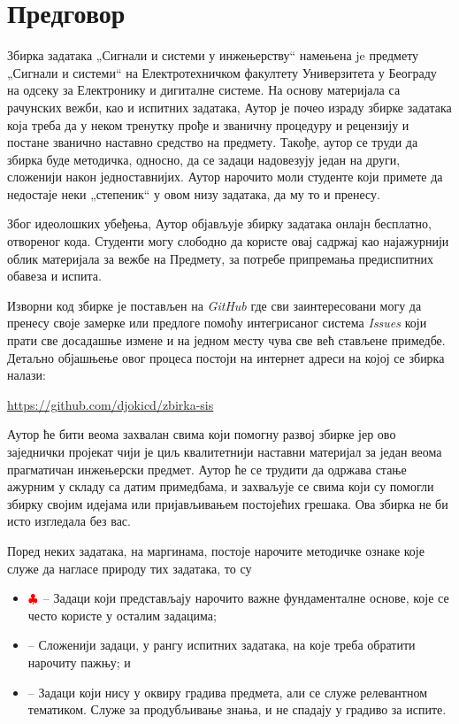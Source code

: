 \section*{Предговор}

Збирка задатака „Сигнали и системи у инжењерству“ намењена je предмету „Сигнали и системи“ на 
Електротехничком факултету Универзитета у Београду на одсеку за Електронику и дигиталне системе. На основу материјала 
са рачунских вежби, као и испитних задатака, Аутор је почео израду збирке задатака која треба да у неком тренутку 
прође и званичну процедуру и рецензију и постане званично наставно средство на предмету. 
Такође, аутор се труди да збирка буде методичка, односно, да се задаци надовезују један на други, сложенији након
једноставнијих. 
Аутор нарочито моли студенте који примете да недостаје неки „степеник“ у овом низу задатака, да му то и
пренесу. 

Због идеолошких убеђења, Аутор објављује збирку задатака онлајн бесплатно, отвореног кода. 
Студенти могу слободно да користе овај садржај као најажурнији облик материјала за вежбе на 
Предмету, за потребе припремања предиспитних обавеза и испита. 

Изворни код збирке је постављен на \textit{GitHub} где сви заинтересовани могу да пренесу своје замерке или 
предлоге помоћу интегрисаног система \textit{Issues} који прати све досадашње измене и на једном месту чува све 
већ стављене примедбе. Детаљно објашњење овог процеса постоји на интернет адреси на којој се збирка налази:
\begin{center}
    \url{https://github.com/djokicd/zbirka-sis}
\end{center}

Аутор ће бити веома захвалан свима који помогну развој збирке јер ово заједнички
пројекат чији је циљ квалитетнији наставни материјал за један веома прагматичан инжењерски предмет. 
Аутор ће се трудити да одржава стање ажурним у складу са датим примедбама, и захваљује се свима 
који су помогли збирку својим идејама или пријављивањем постојећих грешака. Ова збирка не би исто изгледала без вас. 

Поред неких задатака, на маргинама, постоје нарочите методичке ознаке које служе да нагласе природу тих задатака, то су 
\begin{itemize}
    \item $\color{red}\clubsuit$ -- Задаци који представљају нарочито важне фундаменталне основе, које се често користе у 
    осталим задацима;
    \item \textcolor{red}{\warning} -- Сложенији задаци, у рангу испитних задатака, на које треба обратити нарочиту пажњу; и
    \item \textcolor{red}{\noway} -- Задаци који нису у оквиру градива предмета, али се служе релевантном 
    тематиком. Служе за продубљивање знања, и не спадају у градиво за испите. 
\end{itemize}
